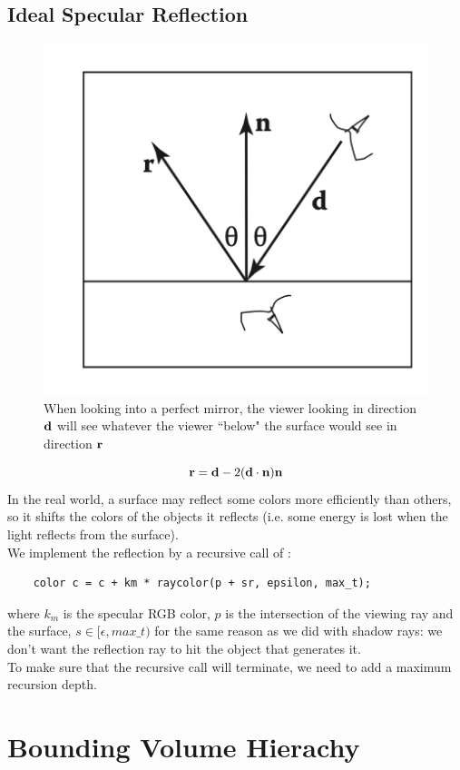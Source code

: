 \documentclass[11pt]{article}
\numberwithin{equation}{section}
\begin{document}
\subsection{Ideal Specular Reflection}
\begin{figure}[H]
	\centering
	\includegraphics[scale=0.5]{p5}
	\caption{When looking into a perfect mirror, the viewer looking in direction $\textbf{d}$ will see whatever the viewer ``below" the surface would see in direction $\textbf{r}$}
\end{figure}
$$\textbf{r} = \textbf{d} - 2(\textbf{d} \cdot \textbf{n})\textbf{n}$$
In the real world, a surface may reflect some colors more efficiently than others, so it shifts the colors of the objects it reflects (i.e. some energy is lost when the light reflects from the surface). \\
We implement the reflection by a recursive call of :
\begin{framed}
\begin{verbatim}
	color c = c + km * raycolor(p + sr, epsilon, max_t);
\end{verbatim}
\end{framed}
\noindent where $k_m$ is the specular RGB color, $p$ is the intersection of the viewing ray and the surface, $s \in [\epsilon, max\_t)$ for the same reason as we did with shadow rays: we don't want the reflection ray to hit the object that generates it.\\
To make sure that the recursive call will terminate, we need to add a maximum recursion depth.


\section{Bounding Volume Hierachy}
\end{document}
